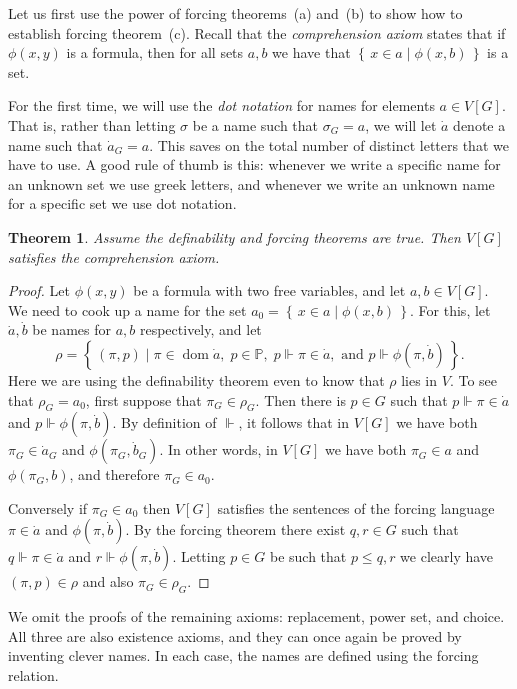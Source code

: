 \documentclass[11pt,oneside,a4paper]{amsbook}
\newcommand{\set}[1]{\left\{\,#1\,\right\}}
\newcommand{\forces}{\Vdash}
\DeclareMathOperator{\dom}{dom}
\theoremstyle{definition}
\theoremstyle{plain}
\newtheorem{theorem}{Theorem}[section]
\theoremstyle{definition}
\theoremstyle{remark}
\numberwithin{equation}{section}
\numberwithin{figure}{section}
\begin{document}
Let us first use the power of forcing theorems~(a) and~(b) to show how to establish forcing theorem~(c). Recall that the \emph{comprehension axiom} states that if $\phi(x,y)$ is a formula, then for all sets $a,b$ we have that $\set{x\in a\mid\phi(x,b)}$ is a set.

For the first time, we will use the \emph{dot notation} for names for elements $a\in V[G]$. That is, rather than letting $\sigma$ be a name such that $\sigma_G=a$, we will let $\dot a$ denote a name such that $\dot a_G=a$. This saves on the total number of distinct letters that we have to use. A good rule of thumb is this: whenever we write a specific name for an unknown set we use greek letters, and whenever we write an unknown name for a specific set we use dot notation.

\begin{theorem}
  Assume the definability and forcing theorems are true. Then $V[G]$ satisfies the comprehension axiom.
\end{theorem}

\begin{proof}
  Let $\phi(x,y)$ be a formula with two free variables, and let $a,b\in V[G]$. We need to cook up a name for the set $a_0=\set{x\in a\mid\phi(x,b)}$. For this, let $\dot a,\dot b$ be names for $a,b$ respectively, and let
  \[\rho=\set{(\pi,p)\mid\pi\in\dom\dot a,\;p\in\mathbb P,\;p\forces\pi\in\dot a,\text{ and }p\forces\phi(\pi,\dot b)}\text{.}
  \]
  Here we are using the definability theorem even to know that $\rho$ lies in $V$. To see that $\rho_G=a_0$, first suppose that $\pi_G\in\rho_G$. Then there is $p\in G$ such that $p\forces\pi\in\dot a$ and $p\forces\phi(\pi,\dot b)$. By definition of $\forces$, it follows that in $V[G]$ we have both $\pi_G\in\dot a_G$ and $\phi(\pi_G,\dot b_G)$. In other words, in $V[G]$ we have both $\pi_G\in a$ and $\phi(\pi_G,b)$, and therefore $\pi_G\in a_0$.

  Conversely if $\pi_G\in a_0$ then $V[G]$ satisfies the sentences of the forcing language $\pi\in\dot a$ and $\phi(\pi,\dot b)$. By the forcing theorem there exist $q,r\in G$ such that $q\forces\pi\in\dot a$ and $r\forces\phi(\pi,\dot b)$. Letting $p\in G$ be such that $p\leq q,r$ we clearly have $(\pi,p)\in\rho$ and also $\pi_G\in\rho_G$.
\end{proof}

We omit the proofs of the remaining axioms: replacement, power set, and choice. All three are also existence axioms, and they can once again be proved by inventing clever names. In each case, the names are defined using the forcing relation.
\end{document}
